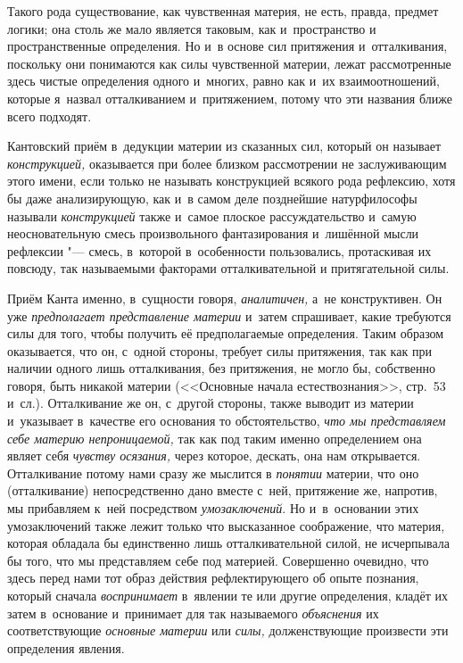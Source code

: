 Такого рода существование, как чувственная материя, не есть, правда, предмет
логики; она столь же мало является таковым, как и~пространство и
пространственные определения. Но и~в основе сил притяжения и~отталкивания,
поскольку они понимаются как силы чувственной материи, лежат рассмотренные
здесь чистые определения одного и~многих, равно как и~их взаимоотношений,
которые я~назвал отталкиванием и~притяжением, потому что эти названия ближе
всего подходят.

Кантовский приём в~дедукции материи из сказанных сил, который он называет
{\em конструкцией,} оказывается при более близком
рассмотрении не заслуживающим этого имени, если только не называть
конструкцией всякого рода рефлексию, хотя бы даже анализирующую, как и~в
самом деле позднейшие натурфилософы называли
{\em конструкцией} также и~самое плоское
рассуждательство и~самую неосновательную смесь произвольного фантазирования
и~лишённой мысли рефлексии "--- смесь, в~которой в~особенности пользовались,
протаскивая их повсюду, так называемыми факторами отталкивательной и
притягательной силы.

Приём Канта именно, в~сущности говоря, {\em аналитичен,}
а~не конструктивен. Он уже {\em предполагает
представление материи} и~затем спрашивает, какие требуются силы для того,
чтобы получить её предполагаемые определения. Таким образом оказывается,
что он, с~одной стороны, требует силы притяжения, так как при наличии
одного лишь отталкивания, без притяжения, не могло бы, собственно говоря,
быть никакой материи (<<Основные начала естествознания>>, стр.~53 и~сл.).
Отталкивание же он, с~другой стороны, также выводит из материи и~указывает
в~качестве его основания то обстоятельство, {\em что мы
представляем себе материю непроницаемой,} так как под таким именно
определением она являет себя {\em чувству осязания,}
через которое, дескать, она нам открывается. Отталкивание потому нами сразу
же мыслится в {\em понятии} материи, что оно
(отталкивание) непосредственно дано вместе с~ней, притяжение же, напротив,
мы прибавляем к~ней посредством {\em умозаключений}. Но
и~в~основании этих умозаключений также лежит только что высказанное
соображение, что материя, которая обладала бы единственно лишь
отталкивательной силой, не исчерпывала бы того, что мы представляем себе
под материей. Совершенно очевидно, что здесь перед нами тот образ действия
рефлектирующего об опыте познания, который сначала
{\em воспринимает} в~явлении те или другие определения,
кладёт их затем в~основание и~принимает для так называемого
{\em объяснения} их соответствующие {\em основные материи} или
{\em силы,} долженствующие произвести эти определения явления.

